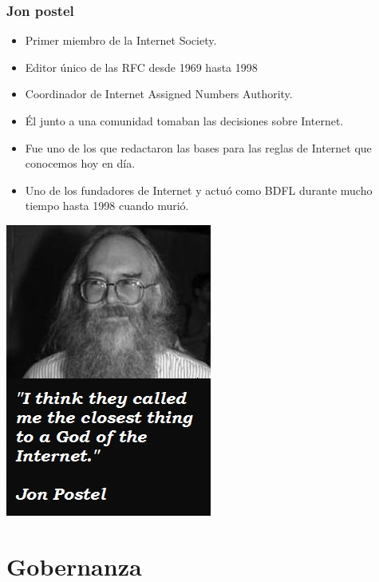\documentclass{beamer}
\begin{document}
\begin{frame}
\frametitle{Jon postel}
	\begin{itemize}	
		\pause \item Primer miembro de la Internet Society.
		\pause \item Editor \'unico de las \alert{RFC} desde 1969 hasta 1998
		\pause \item Coordinador de \alert{I}nternet \alert{A}ssigned \alert{N}umbers \alert{A}uthority.
		\pause \item \'El junto a una comunidad tomaban las decisiones sobre Internet.
		\pause \item Fue uno de los que redactaron las bases para las reglas de Internet que conocemos hoy en d\'ia.
		\pause \item Uno de los fundadores de Internet y actu\'o como BDFL durante mucho tiempo hasta 1998 cuando muri\'o.
	\end{itemize}
\end{frame}

\begin{frame}
	\begin{center}
	            \includegraphics[scale=0.90]{../img/jon-postel.jpg}
	\end{center}	
\end{frame}

\section{Gobernanza}
\end{document}
